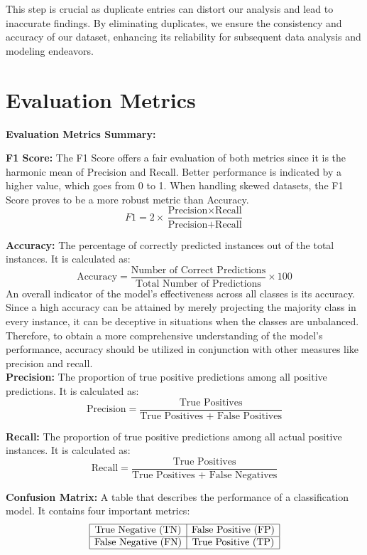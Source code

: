  This step is crucial as duplicate entries can distort our analysis and lead to inaccurate findings. By eliminating duplicates, we ensure the consistency and accuracy of our dataset, enhancing its reliability for subsequent data analysis and modeling endeavors.


\section{Evaluation Metrics}
\textbf{Evaluation Metrics Summary:}
\begin{itemize}
\textbf{F1 Score:} The F1 Score offers a fair evaluation of both metrics since it is the harmonic mean of Precision and Recall. Better performance is indicated by a higher value, which goes from 0 to 1. When handling skewed datasets, the F1 Score proves to be a more robust metric than Accuracy.
\[ F1 = 2 \times \frac{\text{Precision} \times \text{Recall}}{\text{Precision} + \text{Recall}} \]

\textbf{Accuracy:} The percentage of correctly predicted instances out of the total instances. It is calculated as:
\[ \text{Accuracy} = \frac{\text{Number of Correct Predictions}}{\text{Total Number of Predictions}} \times 100 \]
An overall indicator of the model's effectiveness across all classes is its accuracy. Since a high accuracy can be attained by merely projecting the majority class in every instance, it can be deceptive in situations when the classes are unbalanced. Therefore, to obtain a more comprehensive understanding of the model's performance, accuracy should be utilized in conjunction with other measures like precision and recall.
\\

\textbf{Precision:} The proportion of true positive predictions among all positive predictions. It is calculated as:
\[ \text{Precision} = \frac{\text{True Positives}}{\text{True Positives + False Positives}} \]

\textbf{Recall:} The proportion of true positive predictions among all actual positive instances. It is calculated as:
\[ \text{Recall} = \frac{\text{True Positives}}{\text{True Positives + False Negatives}} \]

\textbf{Confusion Matrix:} A table that describes the performance of a classification model. It contains four important metrics:
\[
\begin{array}{|c|c|}
\hline
\text{True Negative (TN)} & \text{False Positive (FP)} \\
\hline
\text{False Negative (FN)} & \text{True Positive (TP)} \\
\hline
\end{array}
\]




\end{itemize}
